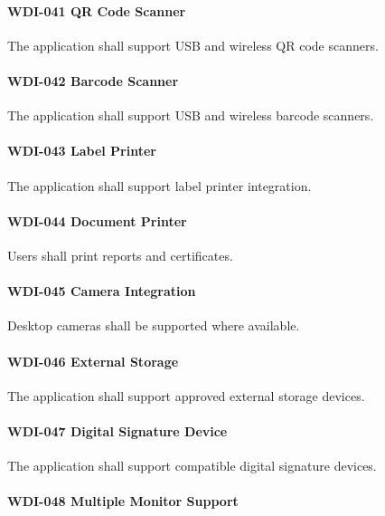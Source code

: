 \paragraph{WDI-041 QR Code Scanner}

The application shall support USB and wireless QR code scanners.

\paragraph{WDI-042 Barcode Scanner}

The application shall support USB and wireless barcode scanners.

\paragraph{WDI-043 Label Printer}

The application shall support label printer integration.

\paragraph{WDI-044 Document Printer}

Users shall print reports and certificates.

\paragraph{WDI-045 Camera Integration}

Desktop cameras shall be supported where available.

\paragraph{WDI-046 External Storage}

The application shall support approved external storage devices.

\paragraph{WDI-047 Digital Signature Device}

The application shall support compatible digital signature devices.

\paragraph{WDI-048 Multiple Monitor Support}

